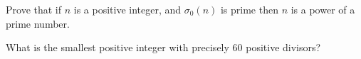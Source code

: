 \vspace*{0.1in}

\begin{problem}\label{problem 3.6}
Prove that if $n$ is a positive integer, and $\sigma_0(n)$ is prime then $n$ is a power of a prime number.
\end{problem}

\vspace*{0.1in}

\begin{problem}\label{problem 3.7}
What is the smallest positive integer with precisely $60$ positive divisors?
\end{problem}